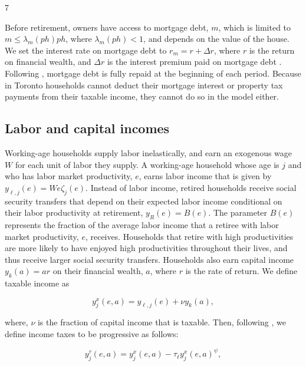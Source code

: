 7\documentclass[parskip=full]{article}
\begin{document}
Before retirement, owners have access to mortgage debt, $m$, which is limited to $m \leq \lambda_{m}(ph) p h$, where $\lambda_{m}(ph)<1$, and depends on the value of the house. We set the interest rate on mortgage debt to $r_{m}=r+\Delta r$, where $r$ is the return on financial wealth, and $\Delta r$ is the interest premium paid on mortgage debt \citep{sommeretal-2013,sommersullivan-2017,kaplanetal-2019}. Following \citet{gervais}, mortgage debt is fully repaid at the beginning of each period. Because in Toronto households cannot deduct their mortgage interest or property tax payments from their taxable income, they cannot do so in the model either.

\subsection{Labor and capital incomes}\label{subsection:income}

Working-age households supply labor inelastically, and earn an exogenous wage $W$ for each unit of labor they supply. A working-age household whose age is $j$ and who has labor market productivity, $e$, earns labor income that is given by $y_{\ell,j}(e)=We\zeta_j(e)$. Instead of labor income, retired households receive social security transfers that depend on their expected labor income conditional on their labor productivity at retirement, $y_{R}(e) = B(e)$. The parameter $B(e)$ represents the fraction of the average labor income that a retiree with labor market productivity, $e$, receives. Households that retire with high productivities are more likely to have enjoyed high productivities throughout their lives, and thus receive larger social security transfers. Households also earn capital income $y_{k}(a)=ar$ on their financial wealth, $a$, where $r$ is the rate of return. We define taxable income as

\begin{equation*}\label{eq:taxable_labor_income}
  y^{x}_{j}(e,a) =y_{\ell,j}(e)+\nu y_{k}(a),
\end{equation*}

\noindent where, $\nu$ is the fraction of capital income that is taxable. Then, following \citet{hsv-2020}, we define income taxes to be progressive as follows:

\begin{equation}\label{eq:income_tax}
  y^{\tau}_{j}(e,a) = y^{x}_{j}(e,a)-\tau_{\ell}y^{x}_{j}(e,a)^{\psi},
\end{equation}
\end{document}
